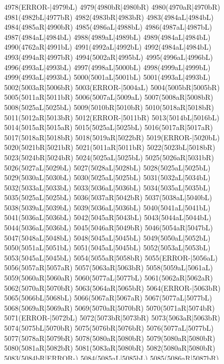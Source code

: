 4978(ERROR-|4979bL) 4979(4980bR|4980bR) 4980(4970aR|4970bR) 4981(4982bL|4977bR) 4982(4983bR|4983bR) 4983(4984aL|4984bL) 4984(4985aR|4990bR) 4985(4986aL|4988bL) 4986(4987aL|4987bL) 4987(4984aL|4984bL) 4988(4989aL|4989bL) 4989(4984aL|4984bL) 4990(4762aR|4991bL) 4991(4992aL|4992bL) 4992(4984aL|4984bL) 4993(4994aR|4997bR) 4994(5002aR|4995bL) 4995(4996aL|4996bL) 4996(4993aL|4993bL) 4997(4998aL|5000bL) 4998(4999aL|4999bL) 4999(4993aL|4993bL) 5000(5001aL|5001bL) 5001(4993aL|4993bL) 5002(5003aR|5006bR) 5003(ERROR-|5004aL) 5004(5005bR|5005bR) 5005(5011aR|5011bR) 5006(5007aL|5009aL) 5007(5008aR|5008bR) 5008(5025aL|5025bL) 5009(5010bR|5010bR) 5010(5018aR|5018bR) 5011(5012aR|5013bR) 5012(ERROR-|5011bR) 5013(5014bL|5016bL) 5014(5015aR|5015aR) 5015(5025aL|5025bL) 5016(5017aR|5017aR) 5017(5018aR|5018bR) 5018(5019aR|5022bR) 5019(ERROR-|5020bL) 5020(5021bR|5021bR) 5021(5011aR|5011bR) 5022(5023bL|5018bR) 5023(5024bR|5024bR) 5024(5025aL|5025bL) 5025(5026aR|5031bR) 5026(5027aL|5029bL) 5027(5028aL|5028bL) 5028(5025aL|5025bL) 5029(5030aL|5030bL) 5030(5025aL|5025bL) 5031(5032aL|5034bL) 5032(5033aL|5033bL) 5033(5036aL|5036bL) 5034(5035aL|5035bL) 5035(5025aL|5025bL) 5036(5037aR|5042bR) 5037(5038aL|5040bL) 5038(5039aL|5039bL) 5039(5036aL|5036bL) 5040(5041aL|5041bL) 5041(5036aL|5036bL) 5042(5045aR|5043bL) 5043(5044aL|5044bL) 5044(5036aL|5036bL) 5045(5046aR|5049bR) 5046(5054aR|5047bL) 5047(5048aL|5048bL) 5048(5045aL|5045bL) 5049(5050aL|5052bL) 5050(5051aL|5051bL) 5051(5045aL|5045bL) 5052(5053aL|5053bL) 5053(5045aL|5045bL) 5054(5055aR|5058bR) 5055(ERROR-|5056aL) 5056(5057aR|5057aR) 5057(5063aR|5063bR) 5058(5059aL|5061aL) 5059(5060aR|5060aR) 5060(5077aL|5077bL) 5061(5062aR|5062aR) 5062(5070aR|5070bR) 5063(5064aR|5065bR) 5064(ERROR-|5063bR) 5065(5066bL|5068bL) 5066(5067aR|5067aR) 5067(5077aL|5077bL) 5068(5069aR|5069aR) 5069(5070aR|5070bR) 5070(5071aR|5074bR) 5071(ERROR-|5072bL) 5072(5073bR|5073bR) 5073(5063aR|5063bR) 5074(5075bL|5070bR) 5075(5076bR|5076bR) 5076(5077aL|5077bL) 5077(5078aR|5079bR) 5078(5080aR|5080bR) 5079(5080aR|5080bR) 5080(5081aR|5082bR) 5081(5083aR|5080bR) 5082(5080aR|5080bR) 5083(5084bR|ERROR-) 5084(5085aL|5085bL) 5085(5086aR|5087bR) 5086(5085aR|5085bR) 5087(5085aR|5088bL) 5088(5089aR|5089bR) 5089(5090aL|5090bL) 5090(5091aR|5092bR) 5091(5125aR|5090bR) 5092(5090aR|5090bR) 5093(5094aR|ERROR-) 5094(5160bR|ERROR-) 5095(5096aR|5101bR) 5096(5097aL|5099bL) 5097(5098aL|5098bL) 5098(5095aL|5095bL) 5099(5100aL|5100bL) 5100(5095aL|5095bL) 5101(5104aR|5102bL) 5102(5103aL|5103bL) 5103(5095aL|5095bL) 5104(5105aR|ERROR-) 5105(5106aL|5108aL) 5106(5107aR|5107bR) 5107(5110aL|5110bL) 5108(5109aR|5109aR) 5109(5160aL|5160bL) 5110(5111aR|5112bR) 5111(5110aR|5110bR) 5112(5113aL|5110bR) 5113(5114aR|5114aR) 5114(5115aR|5115bR) 5115(5116aR|5117bR) 5116(5118aR|5115bR) 5117(5115aR|5115bR) 5118(5119aR|5124bR) 5119(5120aL|5122aL) 5120(5121aR|5121bR) 5121(7659aL|7659bL) 5122(5123bL|5123bL) 5123(5198aL|5198bL) 5124(ERROR-|6847bR) 5125(5126aR|5127bR) 5126(5128aR|5090bR) 5127(5090aR|5090bR) 5128(5129aR|5132bR) 5129(5130aL|5090bR) 5130(5131bR|5131bR) 5131(5093aR|5093bR) 5132(5090aR|5090bR) 5133(5134aR|5137bR) 5134(5135bL|5133bR) 5135(5136aR|5136aR) 5136(5160aR|5160bR) 5137(5138bL|5140bL) 5138(5139aR|5139aR) 5139(5142aR|5142bR) 5140(5141aR|5141aR) 5141(5151aR|5151bR) 5142(5143aR|5148bR) 5143(5144aL|5146aL) 